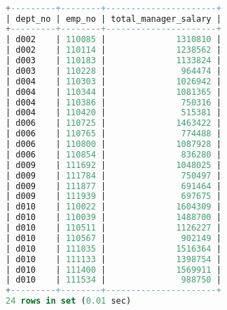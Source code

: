 \documentclass[12pt]{report}
\begin{document}
\begin{lstlisting}[language=sql]

+---------+--------+----------------------+
| dept_no | emp_no | total_manager_salary |
+---------+--------+----------------------+
| d002    | 110085 |              1310810 |
| d002    | 110114 |              1238562 |
| d003    | 110183 |              1133824 |
| d003    | 110228 |               964474 |
| d004    | 110303 |              1026942 |
| d004    | 110344 |              1081365 |
| d004    | 110386 |               750316 |
| d004    | 110420 |               515381 |
| d006    | 110725 |              1463422 |
| d006    | 110765 |               774488 |
| d006    | 110800 |              1087928 |
| d006    | 110854 |               836280 |
| d009    | 111692 |              1048025 |
| d009    | 111784 |               750497 |
| d009    | 111877 |               691464 |
| d009    | 111939 |               697675 |
| d010    | 110022 |              1604309 |
| d010    | 110039 |              1488700 |
| d010    | 110511 |              1126227 |
| d010    | 110567 |               902149 |
| d010    | 111035 |              1516364 |
| d010    | 111133 |              1398754 |
| d010    | 111400 |              1569911 |
| d010    | 111534 |               988750 |
+---------+--------+----------------------+
24 rows in set (0.01 sec)

\end{lstlisting}
\end{document}
